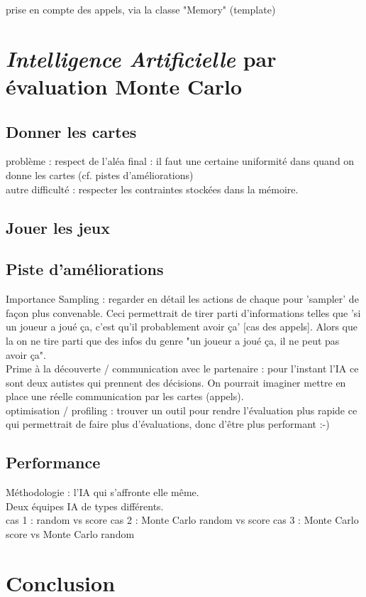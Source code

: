 \documentclass[a4paper,11pt]{article}
\begin{document}
prise en compte des appels, via la classe "Memory" (template)

\clearpage
\section{\textit{Intelligence Artificielle} par évaluation Monte Carlo \label{sec:MCPlay}}
\subsection{Donner les cartes}
problème : respect de l'aléa final : il faut une certaine uniformité dans quand on donne les cartes (cf. pistes d'améliorations) \\

autre difficulté : respecter les contraintes stockées dans la mémoire.
\subsection{Jouer les jeux}
\subsection{Piste d'améliorations}
Importance Sampling : regarder en détail les actions de chaque pour 'sampler' de façon plus convenable. Ceci permettrait de tirer parti d'informations telles que 'si un joueur a joué ça, c'est qu'il probablement avoir ça' [cas des appels]. Alors que la on ne tire parti que des infos du genre "un joueur a joué ça, il ne peut pas avoir ça".  \\

Prime à la découverte / communication avec le partenaire : pour l'instant l'IA ce sont deux autistes qui prennent des décisions. On pourrait imaginer mettre en place une réelle communication par les cartes (appels). \\

optimisation / profiling : trouver un outil pour rendre l'évaluation plus rapide ce qui permettrait de faire plus d'évaluations, donc d'être plus performant :-)
\subsection{Performance}
Méthodologie : l'IA qui s'affronte elle même. \\
Deux équipes IA de types différents. \\
cas 1 : random vs score
cas 2 : Monte Carlo random vs score
cas 3 : Monte Carlo score vs Monte Carlo random

\clearpage
\section*{Conclusion}
\end{document}
